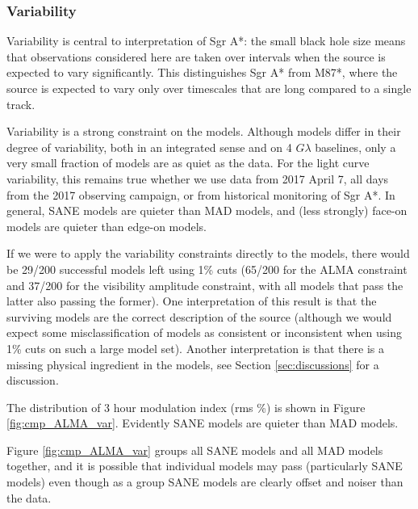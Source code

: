 \subsubsection{Variability}

Variability is central to interpretation of Sgr A*: the small black hole size means that observations considered here are taken over intervals when the source is expected to vary significantly.  This distinguishes Sgr A* from M87*, where the source is expected to vary only over timescales that are long compared to a single track.

Variability is a strong constraint on the models.  Although models differ in their degree of variability, both in an integrated sense and on 4 $G\lambda$ baselines, only a very small fraction of models are as quiet as the data.  For the light curve variability, this remains true whether we use data from 2017 April 7, all days from the 2017 observing campaign, or from historical monitoring of Sgr A*.   In general, SANE models are quieter than MAD models, and (less strongly) face-on models are quieter than edge-on models.

If we were to apply the variability constraints directly to the models, there would be 29/200 successful models left using 1\% cuts (65/200 for the ALMA constraint and 37/200 for the visibility amplitude constraint, with all models that pass the latter also passing the former).  One interpretation of this result is that the surviving models are the correct description of the source (although we would expect some misclassification of models as consistent or inconsistent when using 1\% cuts on such a large model set).  Another interpretation is that there is a missing physical ingredient in the models, see Section \ref{sec:discussions} for a discussion.




The distribution of 3 hour modulation index (rms \%) is shown in Figure \ref{fig:cmp_ALMA_var}.  Evidently SANE models are quieter than MAD models.

Figure \ref{fig:cmp_ALMA_var} groups all SANE models and all MAD models together, and it is possible that individual models may pass (particularly SANE models) even though as a group SANE models are clearly offset and noiser than the data.

